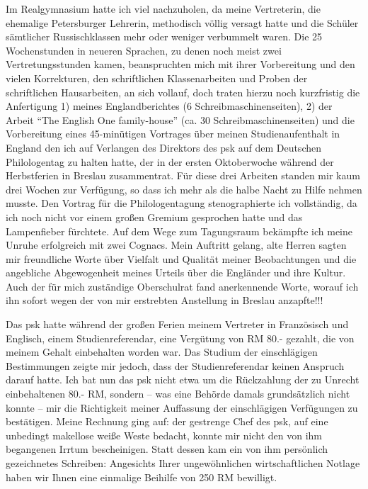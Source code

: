 \documentclass[a5paper,pagesize,10pt,twoside=true]{scrbook}
\begin{document}
Im Realgymnasium hatte ich viel nachzuholen, da meine Vertreterin, die ehemalige Petersburger Lehrerin, methodisch völlig versagt hatte und die Schüler sämtlicher Russischklassen mehr oder weniger verbummelt waren. Die 25 Wochenstunden in neueren Sprachen, zu denen noch meist zwei Vertretungsstunden kamen, beanspruchten mich mit ihrer Vorbereitung und den vielen Korrekturen, den schriftlichen Klassenarbeiten und Proben der schriftlichen Hausarbeiten, an sich vollauf, doch traten hierzu noch kurzfristig die Anfertigung 1) meines Englandberichtes (6 Schreibmaschinenseiten), 2) der Arbeit \enquote{The English One family-house} (ca. 30 Schreibmaschinenseiten) und die Vorbereitung eines 45-minütigen Vortrages über meinen Studienaufenthalt in England den ich auf Verlangen des Direktors des \ac{psk} auf dem Deutschen Philologentag zu halten hatte, der in der ersten Oktoberwoche während der Herbstferien in Breslau zusammentrat. Für diese drei Arbeiten standen mir kaum drei Wochen zur Verfügung, so dass ich mehr als die halbe Nacht zu Hilfe nehmen musste. Den Vortrag für die Philologentagung stenographierte ich vollständig, da ich noch nicht vor einem großen Gremium gesprochen hatte und das Lampenfieber fürchtete. Auf dem Wege zum Tagungsraum bekämpfte ich meine Unruhe erfolgreich mit zwei Cognacs. Mein Auftritt gelang, alte Herren sagten mir freundliche Worte über Vielfalt und Qualität meiner Beobachtungen und die angebliche Abgewogenheit meines Urteils über die Engländer und ihre Kultur. Auch der für mich zuständige Oberschulrat fand anerkennende Worte, worauf ich ihn sofort wegen der von mir erstrebten Anstellung in Breslau anzapfte!!!

Das \ac{psk} hatte während der großen Ferien meinem Vertreter in Französisch und Englisch, einem Studienreferendar, eine Vergütung von RM 80.- gezahlt, die von meinem Gehalt einbehalten worden war. Das Studium der einschlägigen Bestimmungen zeigte mir jedoch, dass der Studienreferendar keinen Anspruch darauf hatte. Ich bat nun das \ac{psk} nicht etwa um die Rückzahlung der zu Unrecht einbehaltenen 80.- RM, sondern -- was eine Behörde damals grundsätzlich nicht konnte -- mir die Richtigkeit meiner Auffassung der einschlägigen Verfügungen zu bestätigen. Meine Rechnung ging auf: der gestrenge Chef des \ac{psk}, auf eine unbedingt makellose weiße Weste bedacht, konnte mir nicht den von ihm begangenen Irrtum bescheinigen. Statt dessen kam ein von ihm persönlich gezeichnetes Schreiben: Angesichts Ihrer ungewöhnlichen wirtschaftlichen Notlage haben wir Ihnen eine einmalige Beihilfe von 250 RM bewilligt.
\end{document}
